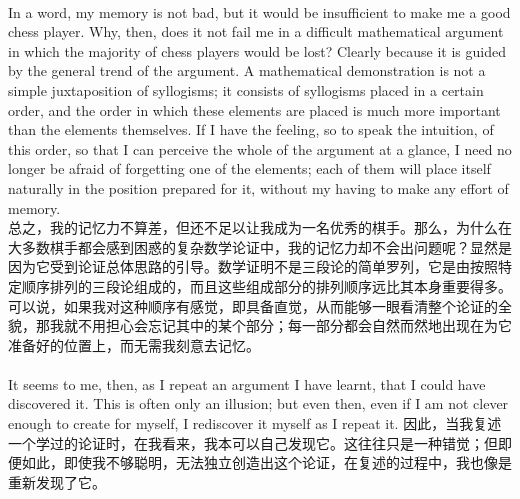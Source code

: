\documentclass{article}
\begin{document}
\\
In a word, my memory is not bad, but it would be insufficient to make me a good chess player. Why, then, does it not fail me in a difficult mathematical argument in which the majority of chess players would be lost? Clearly because it is guided by the general trend of the argument. A mathematical demonstration is not a simple juxtaposition of syllogisms; it consists of syllogisms placed in a certain order, and the order in which these elements are placed is much more important than the elements themselves. If I have the feeling, so to speak the intuition, of this order, so that I can perceive the whole of the argument at a glance, I need no longer be afraid of forgetting one of the elements; each of them will place itself naturally in the position prepared for it, without my having to make any effort of memory.\\
总之，我的记忆力不算差，但还不足以让我成为一名优秀的棋手。那么，为什么在大多数棋手都会感到困惑的复杂数学论证中，我的记忆力却不会出问题呢？显然是因为它受到论证总体思路的引导。数学证明不是三段论的简单罗列，它是由按照特定顺序排列的三段论组成的，而且这些组成部分的排列顺序远比其本身重要得多。可以说，如果我对这种顺序有感觉，即具备直觉，从而能够一眼看清整个论证的全貌，那我就不用担心会忘记其中的某个部分；每一部分都会自然而然地出现在为它准备好的位置上，而无需我刻意去记忆。 \\

\\
It seems to me, then, as I repeat an argument I have learnt, that I could have discovered it. This is often only an illusion; but even then, even if I am not clever enough to create for myself, I rediscover it myself as I repeat it.
因此，当我复述一个学过的论证时，在我看来，我本可以自己发现它。这往往只是一种错觉；但即便如此，即使我不够聪明，无法独立创造出这个论证，在复述的过程中，我也像是重新发现了它。 \\ 
\end{document}
